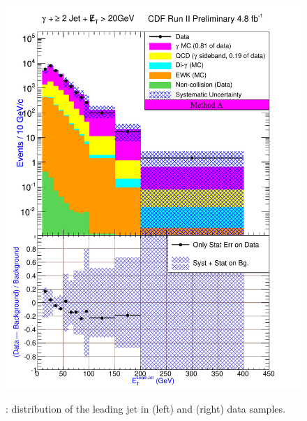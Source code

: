 \documentclass[11pt]{article}
\begin{document}
\begin{figure}[h!]
{ \includegraphics[scale=\resultsHistScale,keepaspectratio=true]{./g30jetmet20_MtdA_plot2_Et_j1.pdf}
}
 \caption{: \et distribution of the leading jet in \phoonejetmettwenty (left) and \photwojetmettwenty (right) data samples.}
 \label{fig:Result_MtdA_gj1Met20_JetEt}
\end{figure}
\end{document}
